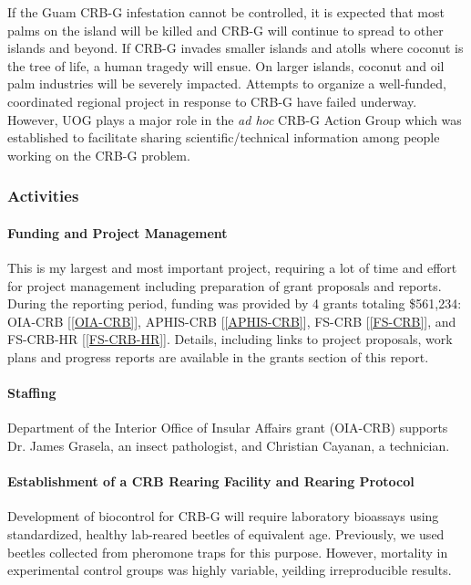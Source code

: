 \begin{refsection}
If the Guam CRB-G infestation cannot be controlled, it is expected
that most palms on the island will be killed and CRB-G will continue
to spread to other islands and beyond. If CRB-G invades smaller islands
and atolls where coconut is the tree of life, a human tragedy will
ensue. On larger islands, coconut and oil palm industries will be
severely impacted. Attempts to organize a well-funded, coordinated regional project in response to CRB-G have failed underway. However, UOG plays a major role in the \textit{ad hoc} CRB-G Action Group which was established to facilitate sharing scientific/technical information among people working on the CRB-G problem.

\subsubsection{Activities}

\paragraph{Funding and Project Management} This is my largest and most important project, requiring a lot of time and effort for project management including preparation of grant proposals and reports. During the reporting period, funding was provided by 4 grants totaling \$561,234: OIA-CRB [\ref{OIA-CRB}], APHIS-CRB [\ref{APHIS-CRB}], FS-CRB [\ref{FS-CRB}], and FS-CRB-HR [\ref{FS-CRB-HR}]. Details, including links to project proposals, work plans and progress reports are available in the grants section of this report.

\paragraph{Staffing}

Department of the Interior Office of Insular Affairs grant (OIA-CRB) supports Dr. James Grasela, an insect pathologist, and Christian Cayanan, a technician.

\paragraph{Establishment of a CRB Rearing Facility and Rearing Protocol}

Development of biocontrol for CRB-G will require laboratory bioassays using standardized, healthy lab-reared beetles of equivalent age. Previously, we used beetles collected from pheromone traps for this purpose. However, mortality in experimental control groups was highly variable, yeilding irreproducible results. 


\end{refsection}
